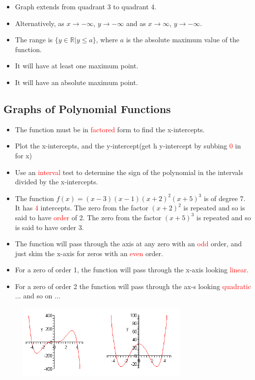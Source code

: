 \documentclass{article}
\begin{document}
\begin{itemize}
    \item Graph extends from quadrant 3 to quadrant 4.
    \item Alternatively, as \( x \to -\infty \), \( y \to -\infty \) and as \( x \to \infty \), \( y \to -\infty \).
    \item The range is \( \{y \in \mathbb{R} | y \leq a\} \), where \( a \) is the absolute maximum value of the function.
    \item It will have at least one maximum point.
    \item It will have an absolute maximum point.
\end{itemize}


\subsection{Graphs of Polynomial Functions}
\begin{itemize}
    \item The function must be in \textcolor{red}{factored} form to find the x-intercepts.
    \item Plot the x-intercepts, and the y-intercept(get h y-intercept by subbing \textcolor{red}{0} in for x)
    \item Use an \textcolor{red}{interval} test to determine the sign of the polynomial in the intervals divided by the x-intercepts.
    \item The function $f(x)=(x-3)(x-1)(x+2)^2(x+5)^3$ is of degree 7. It has \textcolor{red}{4} intercepts. The zero from the factor $(x+2)^2$ is repeated and so is said to have \textcolor{red}{order} of 2. The zero from the factor $(x+5)^3$ is repeated and so is said to have order $3$.
    \item The function will pass through the axis at any zero with an \textcolor{red}{odd} order, and just skim the x-axis for zeros with an \textcolor{red}{even} order.
    \item For a zero of order 1, the function will pass through the x-axis looking \textcolor{red}{linear}.
    \item For a zero of order 2 the function will pass through the ax-s looking \textcolor{red}{quadratic} $\dots$ and so on $\dots$
\end{itemize}

\begin{figure}[h]
    \centering
    \includegraphics[width=0.75\textwidth]{imgs/image001.png}
    \end{figure}
\end{document}
